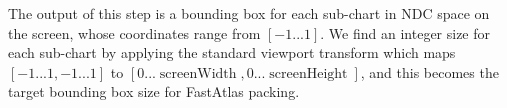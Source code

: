 The output of this step is a bounding box for each sub-chart in NDC space on the screen, whose coordinates range from $[-1...1]$. We find an integer size for each sub-chart by applying the standard viewport transform which maps $[-1...1,-1...1]$ to $[0...\operatorname{screenWidth},0...\operatorname{screenHeight}]$, and this becomes the target bounding box size for FastAtlas packing.
